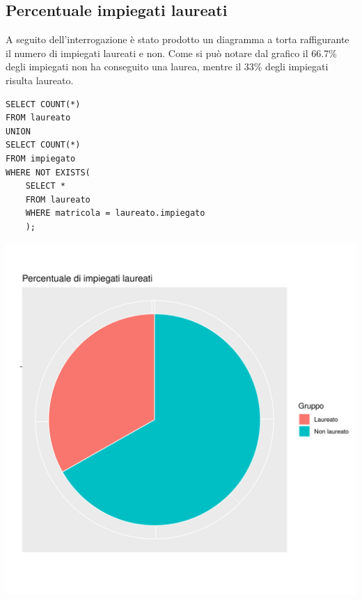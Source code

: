 \documentclass{article}
\begin{document}
\subsection{Percentuale impiegati laureati}
A seguito dell'interrogazione è stato prodotto un diagramma a torta raffigurante il numero di impiegati laureati e non.
\newline
Come si può notare dal grafico il 66.7\% degli impiegati non ha conseguito una laurea, mentre il 33\% degli impiegati risulta laureato.
\begin{verbatim}
SELECT COUNT(*) 
FROM laureato 
UNION 
SELECT COUNT(*) 
FROM impiegato 
WHERE NOT EXISTS(
    SELECT * 
    FROM laureato 
    WHERE matricola = laureato.impiegato
    );
\end{verbatim}
\begin{center}
\includegraphics[width=.96\textwidth]{plot_perc_laureati.png}
\end{center}

\newpage
\end{document}
